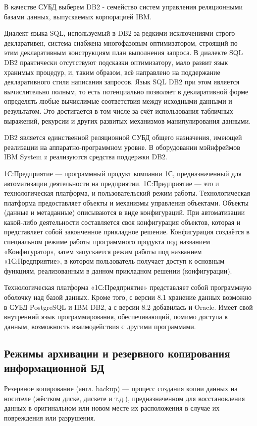 \documentclass[russian,utf8,emptystyle]{eskdtext}
\begin{document}
В качестве СУБД выберем DB2 - семейство систем управления реляционными базами данных, выпускаемых корпорацией IBM.

Диалект языка SQL, используемый в DB2 за редкими исключениями строго декларативен, система снабжена многофазовым оптимизатором, строящий по этим декларативным конструкциям план выполнения запроса. В диалекте SQL DB2 практически отсутствуют подсказки оптимизатору, мало развит язык хранимых процедур, и, таким образом, всё направлено на поддержание декларативного стиля написания запросов. Язык SQL DB2 при этом является вычислительно полным, то есть потенциально позволяет в декларативной форме определять любые вычислимые соответствия между исходными данными и результатом. Это достигается в том числе за счёт использования табличных выражений, рекурсии и других развитых механизмов манипулирования данными.

DB2 является единственной реляционной СУБД общего назначения, имеющей реализации на аппаратно-программном уровне. В оборудовании мэйнфреймов IBM System z реализуются средства поддержки DB2.

1С:Предприятие — программный продукт компании 1С, предназначенный для автоматизации деятельности на предприятии. 1С:Предприятие — это и технологическая платформа, и пользовательский режим работы. Технологическая платформа предоставляет объекты и механизмы управления объектами. Объекты (данные и метаданные) описываются в виде конфигураций. При автоматизации какой-либо деятельности составляется своя конфигурация объектов, которая и представляет собой законченное прикладное решение. Конфигурация создаётся в специальном режиме работы программного продукта под названием «Конфигуратор», затем запускается режим работы под названием «1С:Предприятие», в котором пользователь получает доступ к основным функциям, реализованным в данном прикладном решении (конфигурации).

Технологическая платформа «1С:Предприятие» представляет собой программную оболочку над базой данных. Кроме того, с версии 8.1 хранение данных возможно в СУБД PostgreSQL и IBM DB2, а с версии 8.2 добавилась и Oracle. Имеет свой внутренний язык программирования, обеспечивающий, помимо доступа к данным, возможность взаимодействия с другими программами.

\subsection{Режимы архивации и резервного копирования информационной БД}
Резервное копирование (англ. backup) — процесс создания копии данных на носителе (жёстком диске, дискете и т.д.), предназначенном для восстановления данных в оригинальном или новом месте их расположения в случае их повреждения или разрушения.
\end{document}
